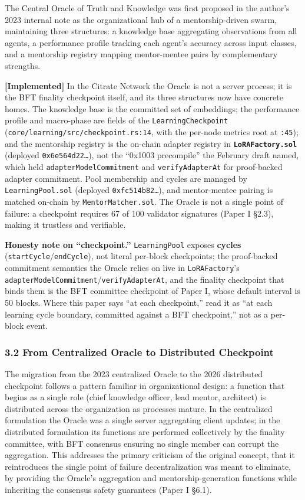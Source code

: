 The Central Oracle of Truth and Knowledge was first proposed in the
author's 2023 internal note as the organizational hub of a
mentorship-driven swarm, maintaining three structures: a knowledge base
aggregating observations from all agents, a performance profile tracking
each agent's accuracy across input classes, and a mentorship registry
mapping mentor-mentee pairs by complementary strengths.

\textbf{{[}Implemented{]}} In the Citrate Network the Oracle is not a
server process; it is the BFT finality checkpoint itself, and its three
structures now have concrete homes. The knowledge base is the committed
set of embeddings; the performance profile and macro-phase are fields of
the \texttt{LearningCheckpoint}
(\texttt{core/learning/src/checkpoint.rs:14}, with the per-node metrics
root at \texttt{:45}); and the mentorship registry is the on-chain
adapter registry in \textbf{\texttt{LoRAFactory.sol}} (deployed
\texttt{0x6e564d22…}), not the ``0x1003 precompile'' the February draft
named, which held \texttt{adapterModelCommitment} and
\texttt{verifyAdapterAt} for proof-backed adapter commitment. Pool
membership and cycles are managed by \texttt{LearningPool.sol} (deployed
\texttt{0xfc514b82…}), and mentor-mentee pairing is matched on-chain by
\texttt{MentorMatcher.sol}. The Oracle is not a single point of failure:
a checkpoint requires 67 of 100 validator signatures (Paper I §2.3),
making it trustless and verifiable.

\textbf{Honesty note on ``checkpoint.''} \texttt{LearningPool} exposes
\textbf{cycles} (\texttt{startCycle}/\texttt{endCycle}), not literal
per-block checkpoints; the proof-backed commitment semantics the Oracle
relies on live in \texttt{LoRAFactory}'s
\texttt{adapterModelCommitment}/\texttt{verifyAdapterAt}, and the
finality checkpoint that binds them is the BFT committee checkpoint of
Paper I, whose default interval is 50 blocks. Where this paper says ``at
each checkpoint,'' read it as ``at each learning cycle boundary,
committed against a BFT checkpoint,'' not as a per-block event.

\subsubsection{3.2 From Centralized Oracle to Distributed
Checkpoint}\label{from-centralized-oracle-to-distributed-checkpoint}

The migration from the 2023 centralized Oracle to the 2026 distributed
checkpoint follows a pattern familiar in organizational design: a
function that begins as a single role (chief knowledge officer, lead
mentor, architect) is distributed across the organization as processes
mature. In the centralized formulation the Oracle was a single server
aggregating client updates; in the distributed formulation its functions
are performed collectively by the finality committee, with BFT consensus
ensuring no single member can corrupt the aggregation. This addresses
the primary criticism of the original concept, that it reintroduces the
single point of failure decentralization was meant to eliminate, by
providing the Oracle's aggregation and mentorship-generation functions
while inheriting the consensus safety guarantees (Paper I §6.1).

